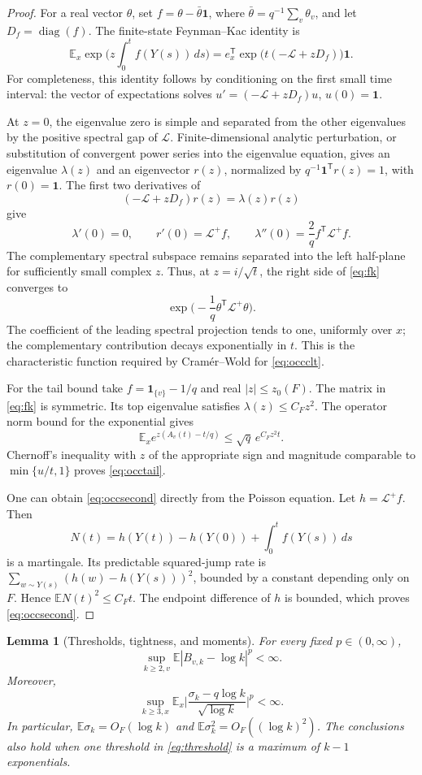 \documentclass[11pt]{amsart}
\newtheorem{lemma}[theorem]{Lemma}
\theoremstyle{remark}
\numberwithin{equation}{section}
\DeclareMathOperator{\diag}{diag}
\newcommand{\E}{\mathbb{E}}
\newcommand{\bone}{\mathbf{1}}
\newcommand{\Lap}{\mathcal{L}}
\newcommand{\ind}{\mathbf{1}}
\newcommand{\T}{\mathsf{T}}
\begin{document}
\begin{proof}
For a real vector $\theta$, set $f=\theta-\bar\theta\bone$, where $\bar\theta=q^{-1}\sum_v\theta_v$, and let $D_f=\diag(f)$. The finite-state Feynman--Kac identity is
\begin{equation}\label{eq:fk}
\E_x\exp\Big(z\int_0^tf(Y(s))\,ds\Big)=e_x^{\T}\exp\big(t(-\Lap+zD_f)\big)\bone.
\end{equation}
For completeness, this identity follows by conditioning on the first small time interval: the vector of expectations solves $u'=(-\Lap+zD_f)u$, $u(0)=\bone$.

At $z=0$, the eigenvalue zero is simple and separated from the other eigenvalues by the positive spectral gap of $\Lap$. Finite-dimensional analytic perturbation, or substitution of convergent power series into the eigenvalue equation, gives an eigenvalue $\lambda(z)$ and an eigenvector $r(z)$, normalized by $q^{-1}\bone^{\T}r(z)=1$, with $r(0)=\bone$. The first two derivatives of
\[
(-\Lap+zD_f)r(z)=\lambda(z)r(z)
\]
give
\[
\lambda'(0)=0,\qquad r'(0)=\Lap^+f,\qquad \lambda''(0)=\frac2qf^{\T}\Lap^+f.
\]
The complementary spectral subspace remains separated into the left half-plane for sufficiently small complex $z$. Thus, at $z=i/\sqrt t$, the right side of \eqref{eq:fk} converges to
\[
\exp\Big(-\frac1q\theta^{\T}\Lap^+\theta\Big).
\]
The coefficient of the leading spectral projection tends to one, uniformly over $x$; the complementary contribution decays exponentially in $t$. This is the characteristic function required by Cram\'er--Wold for \eqref{eq:occclt}.

For the tail bound take $f=\ind_{\{v\}}-1/q$ and real $|z|\le z_0(F)$. The matrix in \eqref{eq:fk} is symmetric. Its top eigenvalue satisfies $\lambda(z)\le C_Fz^2$. The operator norm bound for the exponential gives
\[
\E_xe^{z(A_v(t)-t/q)}\le\sqrt q\,e^{C_Fz^2t}.
\]
Chernoff's inequality with $z$ of the appropriate sign and magnitude comparable to $\min\{u/t,1\}$ proves \eqref{eq:occtail}.

One can obtain \eqref{eq:occsecond} directly from the Poisson equation. Let $h=\Lap^+f$. Then
\[
N(t)=h(Y(t))-h(Y(0))+\int_0^tf(Y(s))\,ds
\]
is a martingale. Its predictable squared-jump rate is $\sum_{w\sim Y(s)}(h(w)-h(Y(s)))^2$, bounded by a constant depending only on $F$. Hence $\E N(t)^2\le C_Ft$. The endpoint difference of $h$ is bounded, which proves \eqref{eq:occsecond}.
\end{proof}

\begin{lemma}[Thresholds, tightness, and moments]\label{lem:thresholds}
For every fixed $p\in(0,\infty)$,
\begin{equation}\label{eq:thresholdmoments}
\sup_{k\ge 2,v}\E|B_{v,k}-\log k|^p<\infty.
\end{equation}
Moreover,
\begin{equation}\label{eq:sigmamoments}
\sup_{k\ge 3,x}\E_x\Big|\frac{\sigma_k-q\log k}{\sqrt{\log k}}\Big|^p<\infty.
\end{equation}
In particular, $\E\sigma_k=O_F(\log k)$ and $\E\sigma_k^2=O_F((\log k)^2)$. The conclusions also hold when one threshold in \eqref{eq:threshold} is a maximum of $k-1$ exponentials.
\end{lemma}
\end{document}
